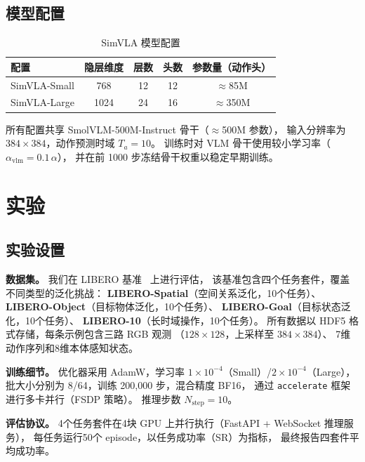 \documentclass[10pt,twocolumn]{article}
\begin{document}
\subsection{模型配置}
\label{sec:config}

\begin{table}[h]
\centering
\caption{SimVLA 模型配置}
\begin{tabular}{lcccc}
\toprule
配置 & 隐层维度 & 层数 & 头数 & 参数量（动作头）\\
\midrule
SimVLA-Small & 768  & 12 & 12 & $\approx$85M \\
SimVLA-Large & 1024 & 24 & 16 & $\approx$350M \\
\bottomrule
\end{tabular}
\end{table}

所有配置共享 SmolVLM-500M-Instruct 骨干（$\approx$500M 参数），
输入分辨率为 $384{\times}384$，动作预测时域 $T_a{=}10$。
训练时对 VLM 骨干使用较小学习率（$\alpha_{\mathrm{vlm}} = 0.1\,\alpha$），
并在前 1000 步冻结骨干权重以稳定早期训练。

\section{实验}

\subsection{实验设置}

\noindent\textbf{数据集。}
我们在 LIBERO 基准~\cite{liu2024libero} 上进行评估，
该基准包含四个任务套件，覆盖不同类型的泛化挑战：
\textbf{LIBERO-Spatial}（空间关系泛化，10个任务）、
\textbf{LIBERO-Object}（目标物体泛化，10个任务）、
\textbf{LIBERO-Goal}（目标状态泛化，10个任务）、
\textbf{LIBERO-10}（长时域操作，10个任务）。
所有数据以 HDF5 格式存储，每条示例包含三路 RGB 观测
（$128{\times}128$，上采样至 $384{\times}384$）、
7维动作序列和8维本体感知状态。

\noindent\textbf{训练细节。}
优化器采用 AdamW，学习率 $1{\times}10^{-4}$（Small）/$2{\times}10^{-4}$（Large），
批大小分别为 8/64，训练 200,000 步，混合精度 BF16，
通过 \texttt{accelerate} 框架进行多卡并行（FSDP 策略）。
推理步数 $N_{\mathrm{step}}{=}10$。

\noindent\textbf{评估协议。}
4个任务套件在4块 GPU 上并行执行（FastAPI + WebSocket 推理服务），
每任务运行50个 episode，以任务成功率（SR）为指标，
最终报告四套件平均成功率。
\end{document}

